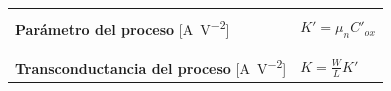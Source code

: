 \documentclass[10pt]{article}
\begin{document}
\begin{table}
\begin{tabular}{|p{5cm}|l|}
		                                                                                                                                                                                                                                                                                             &                                                                                                                                       \\
		\hline
		                                                                                                                                                                                                                                                                                             &                                                                                                                                       \\
		\textbf{Parámetro del proceso} [\si{\ampere\per\volt^2}]                                                                                                                                                                                                                                     & $K' = \mu_n C'_{ox}$                                                                                                                  \\
		                                                                                                                                                                                                                                                                                             &                                                                                                                                       \\
		\hline
		                                                                                                                                                                                                                                                                                             &                                                                                                                                       \\
		\textbf{Transconductancia del proceso} [\si{\ampere\per\volt^2}]                                                                                                                                                                                                                             & $K = \frac{W}{L}K'$                                                                                                                   \\

\end{tabular}
\end{table}
\end{document}
